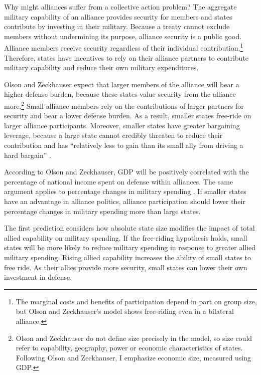 \documentclass[12pt]{article}
\begin{document}
Why might alliances suffer from a collective action problem?
The aggregate military capability of an alliance provides security for members and states contribute by investing in their military.
Because a treaty cannot exclude members without undermining its purpose, alliance security is a public good. 
Alliance members receive security regardless of their individual contribution.\footnote{The marginal costs and benefits of participation depend in part on group size, but Olson and Zeckhauser's model shows free-riding even in a bilateral alliance.}
Therefore, states have incentives to rely on their alliance partners to contribute military capability and reduce their own military expenditures.  

 
Olson and Zeckhauser expect that larger members of the alliance will bear a higher defense burden, because these states value security from the alliance more.\footnote{Olson and Zeckhauser do not define size precisely in the model, so size could refer to capability, geography, power or economic characteristics of states. Following Olson and Zeckhauser, I emphasize economic size, measured using GDP.}
Small alliance members rely on the contributions of larger partners for security and bear a lower defense burden.
As a result, smaller states free-ride on larger alliance participants. 
Moreover, smaller states have greater bargaining leverage, because a large state cannot credibly threaten to reduce their contribution and has ``relatively less to gain than its small ally from driving a hard bargain'' \citep[pg. 274]{OlsonZeckhauser1966}. 


According to Olson and Zeckhauser, GDP will be positively correlated with the percentage of national income spent on defense within alliances.
The same argument applies to percentage changes in military spending \citep{PluemperNeumayer2015}. 
If smaller states have an advantage in alliance politics, alliance participation should lower their percentage changes in military spending more than large states. 


The first prediction considers how absolute state size modifies the impact of total allied capability on military spending. 
If the free-riding hypothesis holds, small states will be more likely to reduce military spending in response to greater allied military spending.  
Rising allied capability increases the ability of small states to free ride. 
As their allies provide more security, small states can lower their own investment in defense. 
\end{document}
